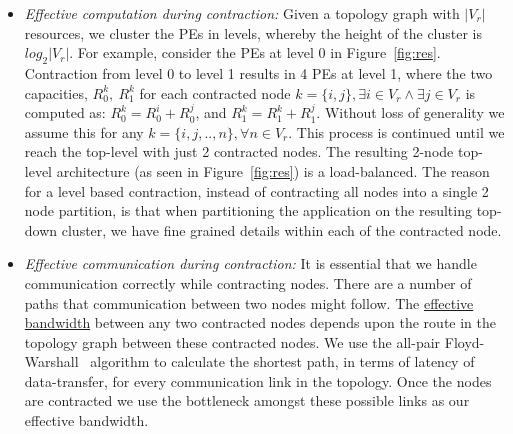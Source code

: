 \begin{itemize}

\item \textit{Effective computation during contraction:} Given a
  topology graph with $|V_r|$ resources, we cluster the PEs in levels,
  whereby the height of the cluster is $log_2|V_r|$. For example,
  consider the PEs at level 0 in Figure~\ref{fig:res}. Contraction from
  level 0 to level 1 results in 4 PEs at level 1, where the two
  capacities, $R^k_0,\ R^k_1$ for each contracted node $k = \{i, j\},
  \exists i \in V_r \wedge \exists j \in V_r$ is computed as: $R^k_0 =
  R^i_0 + R^j_0$, and $R^k_1 = R^k_1 + R^j_1$. Without loss of
  generality we assume this for any $k = \{i,j,..,n\}, \forall n \in
  V_r$. This process is continued until we reach the top-level with just
  2 contracted nodes. The resulting 2-node top-level architecture (as
  seen in Figure~\ref{fig:res}) is a load-balanced. The reason for a
  level based contraction, instead of contracting all nodes into a
  single 2 node partition, is that when partitioning the application on
  the resulting top-down cluster, we have fine grained details within
  each of the contracted node.



\item \textit{Effective communication during contraction:} It is
  essential that we handle communication correctly while contracting
  nodes. There are a number of paths that communication between two
  nodes might follow. The \underline{effective bandwidth} between any
  two contracted nodes depends upon the route in the topology graph
  between these contracted nodes. We use the all-pair
  Floyd-Warshall~\cite{sski08} algorithm to calculate the shortest path,
  in terms of latency of data-transfer, for every communication link
  in the topology. Once the nodes are contracted we use the bottleneck
  amongst these possible links as our effective bandwidth.


\end{itemize}

